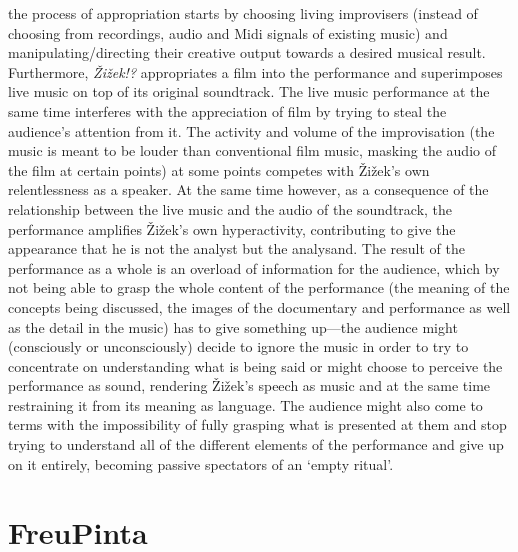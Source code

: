 the process of appropriation starts by choosing living improvisers (instead of choosing  from recordings, audio and Midi signals of existing music) and manipulating/directing their creative output towards a desired musical result. Furthermore, \emph{\v{Z}i\v{z}ek!?} appropriates a film into the performance and superimposes live music on top of its original soundtrack. The live music performance at the same time interferes with the appreciation of film by trying to steal the audience's attention from it. The activity and volume of the improvisation (the music is meant to be louder than conventional film music, masking the audio of the film at certain points) at some points competes with \v{Z}i\v{z}ek's own relentlessness as a speaker. At the same time however, as a consequence of the relationship between the live music and the audio of the soundtrack, the performance amplifies \v{Z}i\v{z}ek's own hyperactivity, contributing to give the appearance that he is not the analyst but the analysand. The result of the performance as a whole is an overload of information for the audience, which by not being able to grasp the whole content of the performance (the meaning of the concepts being discussed, the images of the documentary and performance as well as the detail in the music) has to give something up---the audience might (consciously or unconsciously) decide to ignore the music in order to try to concentrate on understanding what is being said or might choose to perceive the performance as sound, rendering \v{Z}i\v{z}ek's speech as music and at the same time restraining it from its meaning as language. The audience might also come to terms with the impossibility of fully grasping what is presented at them and stop trying to understand all of the different elements of the performance and give up on it entirely, becoming passive spectators of an `empty ritual'.

\section{FreuPinta}

